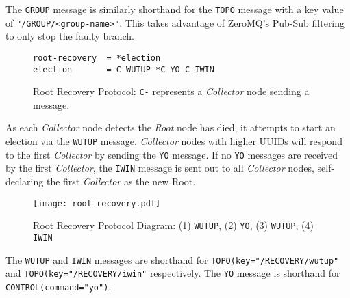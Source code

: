 The \texttt{GROUP} message is similarly shorthand for the \texttt{TOPO} message with a key value of
\texttt{"/GROUP/<group-name>"}. This takes advantage of ZeroMQ's Pub-Sub filtering to only stop the faulty branch.

\begin{figure}[H]
\vspace{+10pt}
\begin{verbatim}
root-recovery  = *election
election       = C-WUTUP *C-YO C-IWIN
\end{verbatim}
\vspace{-5pt}
\caption[Root Recovery Protocol]
        {Root Recovery Protocol: \texttt{C-} represents a \textit{Collector} node sending a message.}
\label{fig:proto_reco_root_spec}
\end{figure}

As each \textit{Collector} node detects the \textit{Root} node has died, it attempts to start an election via the
\texttt{WUTUP} message. \textit{Collector} nodes with higher UUIDs will respond to the first \textit{Collector} by
sending the \texttt{YO} message. If no \texttt{YO} messages are received by the first \textit{Collector}, the
\texttt{IWIN} message is sent out to all \textit{Collector} nodes, self-declaring the first \textit{Collector} as the
new Root.

\begin{figure}[H]
    \centering
    \texttt{[image: root-recovery.pdf]}
    \label{fig:proto_root_reco_image}
    \caption[Root Recovery Protocol Diagram]
	    {Root Recovery Protocol Diagram: (1) \texttt{WUTUP}, (2) \texttt{YO}, (3) \texttt{WUTUP}, (4) \texttt{IWIN}}
\end{figure}

The \texttt{WUTUP} and \texttt{IWIN} messages are shorthand for \texttt{TOPO(key="/RECOVERY/wutup"} and
\texttt{TOPO(key="/RECOVERY/iwin"} respectively. The \texttt{YO} message is shorthand for
\texttt{CONTROL(command="yo")}.
